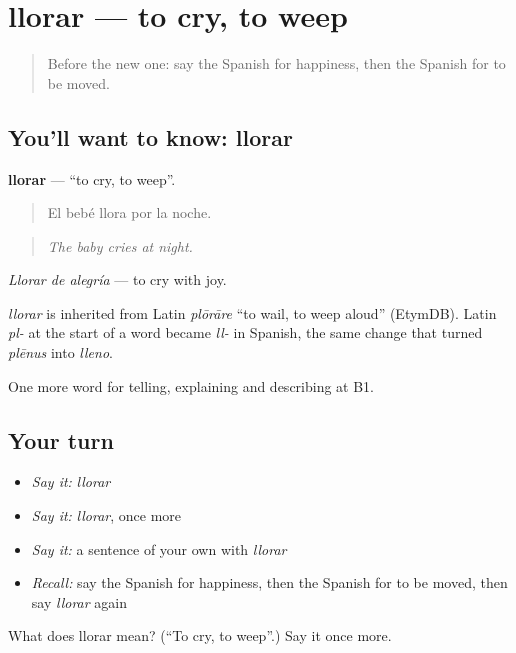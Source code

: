 \section[llorar]{llorar — to cry, to weep}

\label{lesson:ES-C704-llorar}



\begin{quote}
Before the new one: say the Spanish for happiness, then the Spanish for to be moved.
\end{quote}

\subsection*{You'll want to know: llorar}
\textbf{llorar} — \textquotedblleft{}to cry, to weep\textquotedblright{}.

\begin{quote}
El bebé llora por la noche.
\end{quote}

\begin{quote}
\emph{The baby cries at night.}
\end{quote}

\emph{Llorar de alegría} — to cry with joy.

\begin{cousinweb}
\emph{llorar} is inherited from Latin \emph{plōrāre} \textquotedblleft{}to wail, to weep aloud\textquotedblright{} (EtymDB). Latin \emph{pl-} at the start of a word became \emph{ll-} in Spanish, the same change that turned \emph{plēnus} into \emph{lleno}.
\end{cousinweb}

\begin{grammarlens}[title={What you've built}]
One more word for telling, explaining and describing at B1.
\end{grammarlens}

\subsection*{Your turn}
\begin{itemize}
\raggedright
  \item \emph{Say it:} \emph{llorar}
  \item \emph{Say it:} \emph{llorar}, once more
  \item \emph{Say it:} a sentence of your own with \emph{llorar}
  \item \emph{Recall:} say the Spanish for happiness, then the Spanish for to be moved, then say \emph{llorar} again
\end{itemize}

\begin{tcolorbox}[breakable,colback=teal!4,colframe=teal!35!black,title={Before you move on}]
What does llorar mean? (\textquotedblleft{}To cry, to weep\textquotedblright{}.) Say it once more.
\end{tcolorbox}
